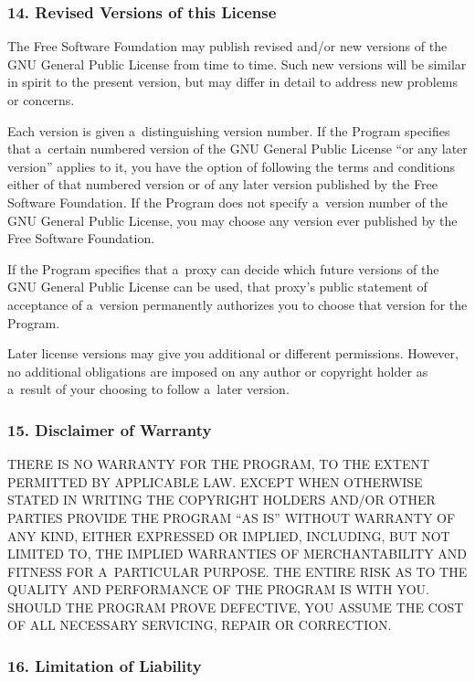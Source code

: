 \documentclass[a4paper, 11pt, twoside]{article}
\begin{document}
\subsubsection{14. Revised Versions of this License}

The Free Software Foundation may publish revised and/or new versions of the GNU General Public License from time to time. Such new versions will be similar in spirit to the present version, but may differ in detail to address new problems or concerns.

Each version is given a~distinguishing version number. If the Program specifies that a~certain numbered version of the GNU General Public License “or any later version” applies to it, you have the option of following the terms and conditions either of that numbered version or of any later version published by the Free Software Foundation. If the Program does not specify a~version number of the GNU General Public License, you may choose any version ever published by the Free Software Foundation.

If the Program specifies that a~proxy can decide which future versions of the GNU General Public License can be used, that proxy's public statement of acceptance of a~version permanently authorizes you to choose that version for the Program.

Later license versions may give you additional or different permissions. However, no additional obligations are imposed on any author or copyright holder as a~result of your choosing to follow a~later version.

\subsubsection{15. Disclaimer of Warranty}

THERE IS NO WARRANTY FOR THE PROGRAM, TO THE EXTENT PERMITTED BY APPLICABLE LAW. EXCEPT WHEN OTHERWISE STATED IN WRITING THE COPYRIGHT HOLDERS AND/OR OTHER PARTIES PROVIDE THE PROGRAM “AS IS” WITHOUT WARRANTY OF ANY KIND, EITHER EXPRESSED OR IMPLIED, INCLUDING, BUT NOT LIMITED TO, THE IMPLIED WARRANTIES OF MERCHANTABILITY AND FITNESS FOR A~PARTICULAR PURPOSE. THE ENTIRE RISK AS TO THE QUALITY AND PERFORMANCE OF THE PROGRAM IS WITH YOU. SHOULD THE PROGRAM PROVE DEFECTIVE, YOU ASSUME THE COST OF ALL NECESSARY SERVICING, REPAIR OR CORRECTION.

\subsubsection{16. Limitation of Liability}
\end{document}
